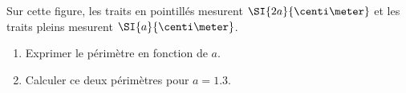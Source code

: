 
\begin{exercice}\label{exo2smath-0240}

    Sur cette figure, les traits en pointillés mesurent $\SI{2a}{\centi\meter}$ et les traits pleins mesurent \( \SI{a}{\centi\meter}\).

\begin{center}
    
\end{center}

\begin{enumerate}
    \item
        
Exprimer le périmètre en fonction de $a$.

\item

Calculer ce deux périmètres pour \( a=1.3\).
\end{enumerate}



\end{exercice}
